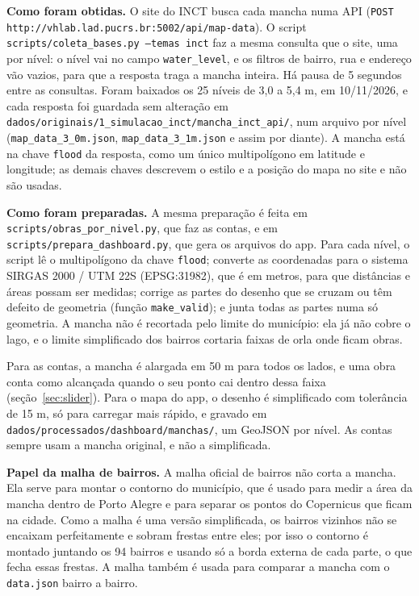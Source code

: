 \documentclass[11pt,a4paper]{article}
\newcommand{\campo}[1]{\texttt{#1}}
\begin{document}
\textbf{Como foram obtidas.} O site do INCT busca cada mancha numa API (\campo{POST http://vhlab.lad.pucrs.br:5002/api/map-data}). O script \campo{scripts/coleta\_bases.py --temas inct} faz a mesma consulta que o site, uma por nível: o nível vai no campo \campo{water\_level}, e os filtros de bairro, rua e endereço vão vazios, para que a resposta traga a mancha inteira. Há pausa de 5 segundos entre as consultas. Foram baixados os 25 níveis de 3,0 a 5,4 m, em 10/11/2026, e cada resposta foi guardada sem alteração em \campo{dados/originais/1\_simulacao\_inct/mancha\_inct\_api/}, num arquivo por nível (\campo{map\_data\_3\_0m.json}, \campo{map\_data\_3\_1m.json} e assim por diante). A mancha está na chave \campo{flood} da resposta, como um único multipolígono em latitude e longitude; as demais chaves descrevem o estilo e a posição do mapa no site e não são usadas.

\textbf{Como foram preparadas.} A mesma preparação é feita em \campo{scripts/obras\_por\_nivel.py}, que faz as contas, e em \campo{scripts/prepara\_dashboard.py}, que gera os arquivos do app. Para cada nível, o script lê o multipolígono da chave \campo{flood}; converte as coordenadas para o sistema SIRGAS 2000 / UTM 22S (EPSG:31982), que é em metros, para que distâncias e áreas possam ser medidas; corrige as partes do desenho que se cruzam ou têm defeito de geometria (função \campo{make\_valid}); e junta todas as partes numa só geometria. A mancha não é recortada pelo limite do município: ela já não cobre o lago, e o limite simplificado dos bairros cortaria faixas de orla onde ficam obras.

Para as contas, a mancha é alargada em 50 m para todos os lados, e uma obra conta como alcançada quando o seu ponto cai dentro dessa faixa (seção~\ref{sec:slider}). Para o mapa do app, o desenho é simplificado com tolerância de 15 m, só para carregar mais rápido, e gravado em \campo{dados/processados/dashboard/manchas/}, um GeoJSON por nível. As contas sempre usam a mancha original, e não a simplificada.

\textbf{Papel da malha de bairros.} A malha oficial de bairros não corta a mancha. Ela serve para montar o contorno do município, que é usado para medir a área da mancha dentro de Porto Alegre e para separar os pontos do Copernicus que ficam na cidade. Como a malha é uma versão simplificada, os bairros vizinhos não se encaixam perfeitamente e sobram frestas entre eles; por isso o contorno é montado juntando os 94 bairros e usando só a borda externa de cada parte, o que fecha essas frestas. A malha também é usada para comparar a mancha com o \campo{data.json} bairro a bairro.
\end{document}
